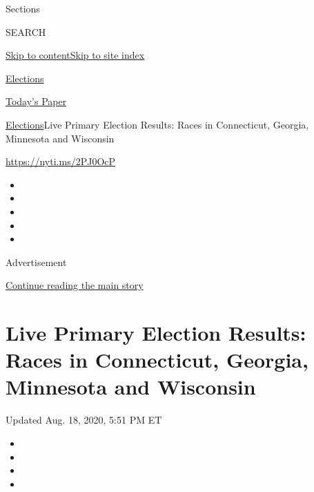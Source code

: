 Sections

SEARCH

\protect\hyperlink{site-content}{Skip to
content}\protect\hyperlink{site-index}{Skip to site index}

\href{https://www.nytimes3xbfgragh.onion/news-event/2020-election}{Elections}

\href{https://myaccount.nytimes3xbfgragh.onion/auth/login?response_type=cookie\&client_id=vi}{}

\href{https://www.nytimes3xbfgragh.onion/section/todayspaper}{Today's
Paper}

\href{/news-event/2020-election}{Elections}\textbar{}Live Primary
Election Results: Races in Connecticut, Georgia, Minnesota and Wisconsin

\url{https://nyti.ms/2PJ0OcP}

\begin{itemize}
\item
\item
\item
\item
\item
\end{itemize}

Advertisement

\protect\hyperlink{after-top}{Continue reading the main story}

\hypertarget{live-primary-election-results-races-in-connecticut-georgia-minnesota-and-wisconsin}{%
\section{Live Primary Election Results: Races in Connecticut, Georgia,
Minnesota and
Wisconsin}\label{live-primary-election-results-races-in-connecticut-georgia-minnesota-and-wisconsin}}

Updated Aug. 18, 2020, 5:51 PM ET

\begin{itemize}
\item
\item
\item
\item
\end{itemize}

